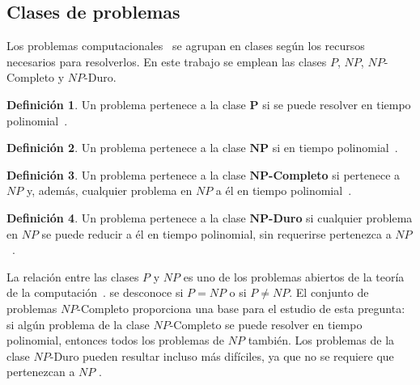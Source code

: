 \documentclass{report}
\theoremstyle{definition}
\newtheorem{definicion}{Definición}[chapter]
\theoremstyle{plain}
\theoremstyle{remark}
\begin{document}

\subsection{Clases de problemas}

Los problemas computacionales~\cite{hopcroft2006introduction} se agrupan en clases según los recursos necesarios para resolverlos. En este trabajo se emplean las clases $P$, $NP$, $NP$-Completo y $NP$-Duro.

\begin{definicion}
  Un problema pertenece a la clase $\boldsymbol{P}$ si se puede resolver en tiempo polinomial~\cite{hopcroft2006introduction}.
\end{definicion}


\begin{definicion}
  Un problema pertenece a la clase $\boldsymbol{NP}$ si  en tiempo polinomial~\cite{hopcroft2006introduction}.
\end{definicion}


\begin{definicion}
  Un problema pertenece a la clase $\boldsymbol{NP}$\textbf{-Completo} si pertenece a $NP$ y, además, cualquier problema en $NP$  a él en tiempo polinomial~\cite{hopcroft2006introduction}.
\end{definicion}


\begin{definicion}
  Un problema pertenece a la clase $\boldsymbol{NP}$\textbf{-Duro} si cualquier problema en $NP$ se puede reducir a él en tiempo polinomial, sin requerirse  pertenezca a $NP$~\cite{hopcroft2006introduction}.
\end{definicion}


La relación entre las clases $P$ y $NP$ es uno de los problemas abiertos de la teoría de la computación~\cite{hopcroft2006introduction}.   se desconoce si $P = NP$ o si $P \neq NP$. El conjunto de problemas $NP$-Completo proporciona una base para el estudio de esta pregunta: si algún problema de la clase $NP$-Completo se puede resolver en tiempo polinomial, entonces todos los problemas de $NP$ también. Los problemas de la clase $NP$-Duro pueden resultar incluso más difíciles, ya que no se requiere que pertenezcan a $NP$ \agregaesto{[REF]}.
\end{document}
